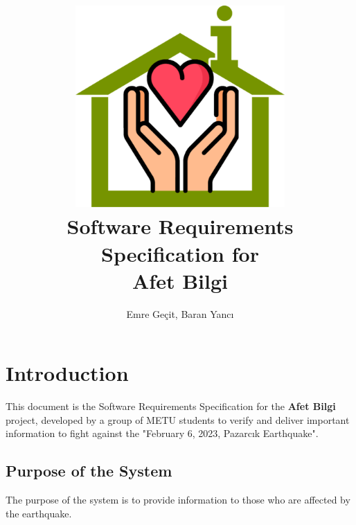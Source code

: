 \documentclass[a4paper]{article}
\author{Emre Geçit, Baran Yancı}
\begin{document}
    \title{\includegraphics[width=0.6\textwidth]{assets/favicon.png}\\ Software Requirements Specification for \\  \textbf{Afet Bilgi}}
    \maketitle

    \newpage
    \makeatletter
	\renewcommand\tableofcontents{%
		\null\hfill\textbf{\Large\contentsname}\hfill\null\par
		\@mkboth{\MakeUppercase\contentsname}{\MakeUppercase\contentsname}%
	}
	\makeatother

    \tableofcontents
    \doublespacing

    \newpage

    \section{Introduction}
        This document is the Software Requirements Specification for the \textbf{Afet Bilgi} project, developed by a group of METU students to verify and deliver important information to fight against the "February 6, 2023, Pazarcık Earthquake".
        \subsection{Purpose of the System}

            The purpose of the system is to provide information to those who are affected by the earthquake.
\end{document}
